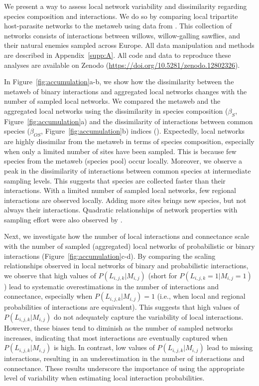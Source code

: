 \begin{box2.2}

We present a way to assess local network variability and dissimilarity regarding
species composition and interactions. We do so by comparing local tripartite
host-parasite networks to the metaweb using data from
\textcite{Kopelke2017Foodweb}. This collection of networks consists of
interactions between willows, willow-galling sawflies, and their natural enemies
sampled across Europe. All data manipulation and methods are described in
Appendix~\ref{supp:A}. All code and data to reproduce these analyses are
available on Zenodo (\url{https://doi.org/10.5281/zenodo.12802326}).

In Figure~\ref{fig:accumulation}a-b, we show how the dissimilarity between the
metaweb of binary interactions and aggregated local networks changes with the
number of sampled local networks. We compared the metaweb and the aggregated
local networks using the dissimilarity in species composition ($\beta_{S}$,
Figure~\ref{fig:accumulation}a) and the dissimilarity of interactions between
common species ($\beta_{OS}$, Figure~\ref{fig:accumulation}b) indices
(\cite{Poisot2012Dissimilarity}). Expectedly, local networks are highly
dissimilar from the metaweb in terms of species composition, especially when
only a limited number of sites have been sampled. This is because few species
from the metaweb (species pool) occur locally. Moreover, we observe a peak in
the dissimilarity of interactions between common species at intermediate
sampling levels. This suggests that species are collected faster than their
interactions. With a limited number of sampled local networks, few regional
interactions are observed locally. Adding more sites brings new species, but not
always their interactions. Quadratic relationships of network properties with
sampling effort were also observed by \textcite{McLeod2021Sampling}.

Next, we investigate how the number of local interactions and connectance scale
with the number of sampled (aggregated) local networks of probabilistic or
binary interactions (Figure~\ref{fig:accumulation}c-d). By comparing the scaling
relationships observed in local networks of binary and probabilistic
interactions, we observe that high values of $P(L_{i, j, k}|M_{i, j})$ (short
for $P(L_{i, j, k} = 1|M_{i, j} = 1)$) lead to systematic overestimations in the
number of interactions and connectance, especially when $P(L_{i, j, k}|M_{i, j})
= 1$ (i.e., when local and regional probabilities of interactions are
equivalent). This suggests that high values of $P(L_{i, j, k}|M_{i, j})$ do not
adequately capture the variability of local interactions. However, these biases
tend to diminish as the number of sampled networks increases, indicating that
most interactions are eventually captured when $P(L_{i, j, k}|M_{i, j})$ is
high. In contrast, low values of $P(L_{i, j, k}|M_{i, j})$ lead to missing
interactions, resulting in an underestimation in the number of interactions and
connectance. These results underscore the importance of using the appropriate
level of variability when estimating local interaction probabilities.


\end{box2.2}
